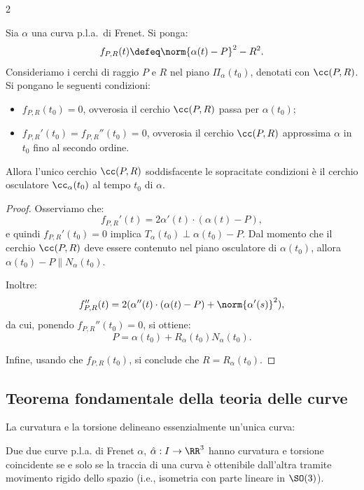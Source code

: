 \begin{multicols*}{2}
    \begin{proposition}
        Sia $\alpha$ una curva p.l.a.~di Frenet. Si ponga:
        \[
            f_{P, R}(t) \defeq \norm{\alpha(t) - P}^2 - R^2.
        \]
        Consideriamo i cerchi di raggio $P$ e $R$ nel piano $\Pi_\alpha(t_0)$, denotati con $\cc(P, R)$.
        Si pongano le seguenti condizioni:
        \begin{itemize}
            \item $f_{P, R}(t_0) = 0$, ovverosia il cerchio $\cc(P, R)$ passa per $\alpha(t_0)$;
            \item $f_{P, R}'(t_0) = f_{P, R}''(t_0) = 0$, ovverosia il
                  cerchio $\cc(P, R)$ approssima $\alpha$ in $t_0$ fino al secondo ordine.
        \end{itemize}
        Allora l'unico cerchio $\cc(P, R)$
        soddisfacente le sopracitate condizioni
        è il cerchio osculatore $\cc_\alpha(t_0)$ al tempo $t_0$ di $\alpha$.
    \end{proposition}

    \begin{proof}
        Osserviamo che:
        \[ f_{P, R}'(t) = 2 \alpha'(t) \cdot (\alpha(t) - P), \]
        e quindi $f_{P, R}'(t_0) = 0$ implica $T_{\alpha}(t_0) \perp \alpha(t_0) - P$.
        Dal momento che il cerchio $\cc(P, R)$ deve essere contenuto nel piano osculatore
        di $\alpha(t_0)$, allora $\alpha(t_0) - P \parallel N_\alpha(t_0)$. \medskip

        Inoltre:
        \[ f_{P, R}''(t) = 2 (\alpha''(t) \cdot (\alpha(t) - P) + \norm{\alpha'(s)}^2), \]
        da cui, ponendo $f_{P, R}''(t_0) = 0$, si ottiene:
        \[ P = \alpha(t_0) + R_\alpha(t_0) N_\alpha(t_0). \]

        Infine, usando che $f_{P, R}(t_0)$, si conclude che $R = R_\alpha(t_0)$.
    \end{proof}

    \subsection{Teorema fondamentale della teoria delle curve}

    La curvatura e la torsione delineano essenzialmente un'unica curva:

    \begin{theorem}
        Due due curve p.l.a.
        di Frenet $\alpha$, $\hat{\alpha} : I \to \RR^3$ hanno curvatura e torsione
        coincidente se e solo se la traccia di una curva è ottenibile dall'altra tramite
        movimento rigido dello spazio \textnormal{(i.e., isometria con
            parte lineare in $\SO(3)$)}.
    \end{theorem}
\end{multicols*}
